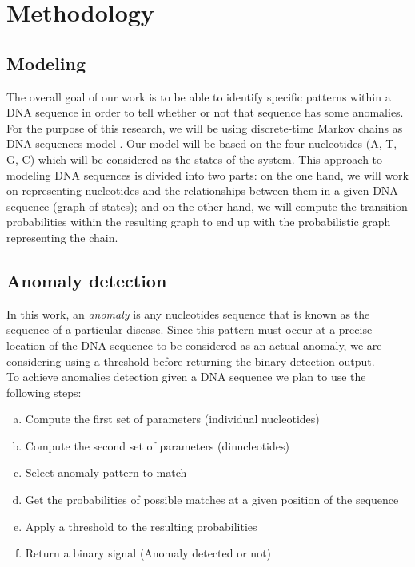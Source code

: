 \documentclass[10pt,twocolumn,letterpaper]{article}
\begin{document}
\section{Methodology}
 {  
    \subsection{Modeling}  
    {
        The overall goal of our work is to be able to identify specific patterns within a DNA sequence in order to tell whether or not that sequence has some anomalies.\\
        For the purpose of this research, we will be using discrete-time Markov chains as DNA sequences model \cite{singh}. 
       Our model will be based on the four nucleotides (A, T, G, C) which will be considered as the states of the system.
       This approach to modeling DNA sequences is divided into two parts: on the one hand, we will work on representing nucleotides and the relationships between them in a given DNA sequence (graph of states); 
           and on the other hand, we will compute the transition probabilities within the resulting graph to end up with the probabilistic graph representing the chain.
    }  

    \subsection{Anomaly detection}
    {In this work, an \textit{anomaly} is any nucleotides sequence that is known as the sequence of a particular disease. Since this pattern must occur at a precise location of the DNA sequence to be considered as an actual 
    anomaly, we are considering using a threshold before returning the binary detection output.\\ 
    To achieve anomalies detection given a DNA sequence we plan to use the following steps:
    \begin{enumerate}[a.]
        \item Compute the first set of parameters (individual nucleotides)
        \item Compute the second set of parameters (dinucleotides)
        \item Select anomaly pattern to match
        \item Get the probabilities of possible matches at a given position of the sequence
        \item Apply a threshold to the resulting probabilities
        \item Return a binary signal (Anomaly detected or not)
    \end{enumerate}
    }
 }
\end{document}
